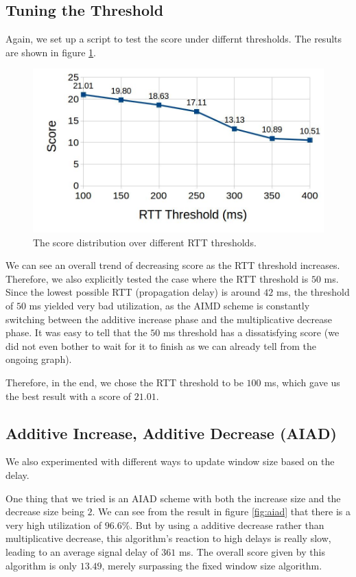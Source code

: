 \documentclass[11pt,a4paper]{article}
\begin{document}
\subsection{Tuning the Threshold}

Again, we set up a script to test the score under differnt thresholds. The
results are shown in figure \ref{fig:warmup-c}.

\begin{figure}[]
  \includegraphics[scale=0.45]{warmup-c}
  \caption{The score distribution over different RTT thresholds.}
  \label{fig:warmup-c}
\end{figure}

We can see an overall trend of decreasing score as the RTT threshold increases.
Therefore, we also explicitly tested the case where the RTT threshold is $50$ ms. Since the
lowest possible RTT (propagation delay) is around $42$ ms, the threshold of $50$
ms yielded
very bad utilization, as the AIMD scheme is constantly switching between the
additive increase phase and the multiplicative decrease phase. It was easy to
tell that the $50$ ms threshold has a dissatisfying score (we did not even bother
to wait for
it to finish as we can already tell from the ongoing graph).

Therefore, in the end, we chose the RTT threshold to be $100$ ms, which gave us
the best result with a score of $21.01$.

\subsection{Additive Increase, Additive Decrease (AIAD)}
\label{ssec:aiad}
We also experimented with different ways to update window size based on the
delay.

One thing that we tried is an AIAD scheme with both the increase size and
the decrease size being $2$. We can see from the result in figure \ref{fig:aiad}
that there is a very high utilization of $96.6\%$. But by using a
additive decrease rather than multiplicative decrease, this algorithm's reaction to
high delays is really slow, leading to an average signal delay of $361$ ms. The
overall score given by this algorithm is only $13.49$, merely surpassing the
fixed window size algorithm.
\end{document}
